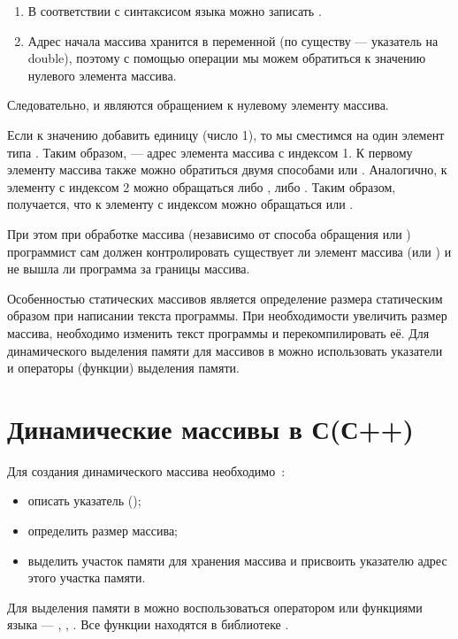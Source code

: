 \begin{enumerate}
\item В соответствии с синтаксисом языка  можно записать .
\item Адрес начала массива хранится в переменной  (по существу  --- указатель на
double), поэтому с помощью операции  мы можем обратиться к значению нулевого элемента массива.
\end{enumerate}
Следовательно,  и  являются обращением к
нулевому элементу массива.

Если к значению добавить единицу (число 1), то мы сместимся на один элемент типа .
Таким образом,  --- адрес элемента массива  с индексом 1. К
первому элементу массива  также можно обратиться двумя способами  или
. Аналогично, к элементу с индексом 2 можно обращаться либо , либо
. Таким образом, получается, что к элементу с индексом  можно обращаться
 или . 

При этом при обработке массива (независимо от способа обращения  или )
программист сам должен контролировать существует ли элемент массива  (или
) и не вышла ли программа за границы массива.

Особенностью статических массивов является определение размера статическим образом при написании текста программы. При
необходимости увеличить размер массива, необходимо изменить текст программы и перекомпилировать её. Для динамического
выделения памяти для массивов в  можно использовать указатели и операторы (функции) выделения памяти.

\section[Динамические массивы в С(С++)]{Динамические массивы в С(С++)}
Для создания динамического массива необходимо~\cite{VC++,Shim}:%

\begin{itemize}
\item описать указатель ();
\item определить размер массива;
\item выделить участок памяти для хранения массива и присвоить указателю адрес этого участка памяти.
\end{itemize}
Для выделения памяти в  можно воспользоваться оператором  или функциями языка  ---
, , . Все функции находятся в библиотеке
.

